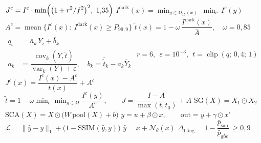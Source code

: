 \documentclass[border=1.5pt,multi=eqn]{standalone}
\newenvironment{eqn}[1]{\fontsize{18}{22}\selectfont\color[HTML]{#1}$\displaystyle}{$}
\begin{document}
\begin{eqn}{0E2238}J^{c}=I^{c}\cdot\min\Bigl(\bigl(1+r^{2}/f^{2}\bigr)^{2},\ 1{,}35\Bigr)\end{eqn}
\begin{eqn}{0E2238}I^{\mathrm{dark}}(x)=\min_{y\in\Omega_{15}(x)}\ \min_{c}\,I^{c}(y)\end{eqn}
\begin{eqn}{0E2238}A^{c}=\operatorname{mean}\bigl\{I^{c}(x):\ I^{\mathrm{dark}}(x)\ge P_{99{,}9}\bigr\}\end{eqn}
\begin{eqn}{0E2238}\tilde t(x)=1-\omega\,\dfrac{I^{\mathrm{dark}}(x)}{\bar A},\quad \omega=0{,}85\end{eqn}
\begin{eqn}{0E2238}\begin{aligned}q_i&=\bar a_k\,Y_i+\bar b_k\\ a_k&=\dfrac{\operatorname{cov}_k(Y,\tilde t)}{\operatorname{var}_k(Y)+\varepsilon},\quad b_k=\bar{\tilde t}_k-a_k\bar Y_k\end{aligned}\end{eqn}
\begin{eqn}{0E2238}r=6,\ \ \varepsilon=10^{-3},\ \ t=\operatorname{clip}(q;\,0{,}4;\,1)\end{eqn}
\begin{eqn}{0E2238}J^{c}(x)=\dfrac{I^{c}(x)-A^{c}}{t(x)}+A^{c}\end{eqn}
\begin{eqn}{0E2238}\tilde t=1-\omega\min_{c}\min_{y\in\Omega}\dfrac{I^{c}(y)}{A^{c}},\qquad J=\dfrac{I-A}{\max(t,t_0)}+A\end{eqn}
\begin{eqn}{0E2238}\mathrm{SG}(X)=X_{1}\odot X_{2}\end{eqn}
\begin{eqn}{0E2238}\mathrm{SCA}(X)=X\odot\bigl(W\,\mathrm{pool}(X)+b\bigr)\end{eqn}
\begin{eqn}{0E2238}y=u+\beta\odot x,\qquad \mathrm{out}=y+\gamma\odot x'\end{eqn}
\begin{eqn}{0E2238}\mathcal{L}=\bigl\|\hat y-y\bigr\|_{1}+\bigl(1-\mathrm{SSIM}(\hat y,y)\bigr)\end{eqn}
\begin{eqn}{0E2238}\hat y=x+\mathcal{N}_{\theta}(x)\end{eqn}
\begin{eqn}{0E2238}\Delta_{\text{hồng}}=1-\dfrac{\bar p_{\text{sau}}}{\bar p_{\text{gốc}}}\ \ge 0{,}9\end{eqn}
\end{document}
